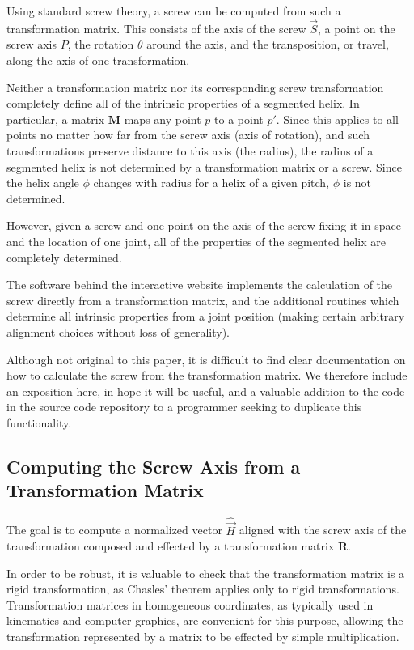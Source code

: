 \documentclass[11pt]{article}
\begin{document}
{Using standard screw theory\cite{wittenburg2016kinematics,wiki:screwaxis},
a screw can be computed from such
a transformation matrix. This consists of the axis of the screw $\overrightarrow{S}$,
a point on the screw axis $P$,
the rotation $\theta$ around the axis, and the
transposition, or travel, along the axis of one transformation.

Neither a transformation matrix nor its corresponding screw transformation
completely define all of the intrinsic
properties of a segmented helix. In particular, a matrix $\bm{M}$ maps any point $p$ to a point $p'$.
Since this applies to all points no matter how far from the screw axis (axis of rotation), and
such transformations preserve distance to this axis (the radius), the radius of a segmented helix
is not determined by a transformation matrix or a screw. Since the helix angle $\phi$ changes
with radius for a helix of a given pitch, $\phi$ is not determined.

However, given a screw and one point on the axis of the screw fixing it in space
and the location of one joint, all of the properties of the segmented helix are completely determined.

The software behind the interactive website implements the calculation of the screw
directly from a transformation matrix, and
the additional routines which determine all intrinsic properties from a joint position (making
certain arbitrary alignment choices without loss of generality).

Although not original to this paper, it is
difficult to find clear documentation on how to calculate the
screw from the transformation matrix.
We therefore include an exposition here, in hope it will be useful,
and a valuable addition to the code in the source code repository to a programmer seeking to duplicate
this functionality.

\subsection{Computing the Screw Axis from a Transformation Matrix}

The goal is to compute a normalized vector $\hat{\overrightarrow{H}}$ aligned with the screw
axis of the transformation composed and effected by a transformation matrix $\bm{R}$.

In order to be robust, it is valuable to check that the transformation
matrix is a rigid transformation\cite{wiki:rigid},
as Chasles' theorem applies only to rigid transformations.
Transformation matrices in homogeneous coordinates, as typically used in kinematics
and computer graphics, are convenient for this purpose, allowing the transformation
represented by a matrix to be effected by simple multiplication.

}
\end{document}
